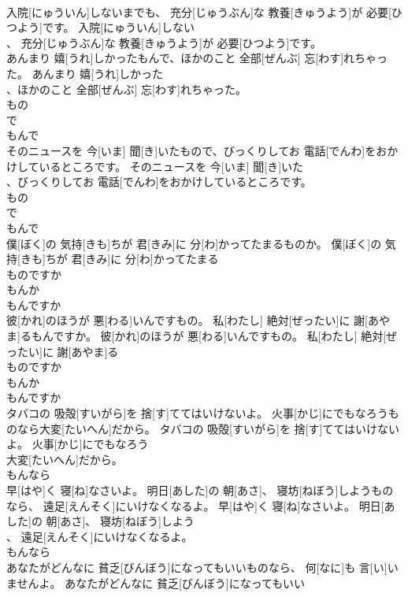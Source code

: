 \documentclass[8pt]{extreport}
\begin{document}
\begin{CJK}{UTF8}{min}
\\	入院[にゅういん]しないまでも、 充分[じゅうぶん]な 教養[きゅうよう]が 必要[ひつよう]です。	入院[にゅういん]しない
\\	、 充分[じゅうぶん]な 教養[きゅうよう]が 必要[ひつよう]です。	
\\	あんまり 嬉[うれ]しかったもんで、ほかのこと 全部[ぜんぶ] 忘[わす]れちゃった。	あんまり 嬉[うれ]しかった
\\	、ほかのこと 全部[ぜんぶ] 忘[わす]れちゃった。	
\\	もの 
\\	で 
\\	もんで 
\\	そのニュースを 今[いま] 聞[き]いたもので、びっくりしてお 電話[でんわ]をおかけしているところです。	そのニュースを 今[いま] 聞[き]いた
\\	、びっくりしてお 電話[でんわ]をおかけしているところです。	
\\	もの 
\\	で 
\\	もんで 
\\	僕[ぼく]の 気持[きも]ちが 君[きみ]に 分[わ]かってたまるものか。	僕[ぼく]の 気持[きも]ちが 君[きみ]に 分[わ]かってたまる
\\	ものですか 
\\	もんか 
\\	もんですか
\\	彼[かれ]のほうが 悪[わる]いんですもの。 私[わたし] 絶対[ぜったい]に 謝[あやま]るもんですか。	彼[かれ]のほうが 悪[わる]いんですもの。 私[わたし] 絶対[ぜったい]に 謝[あやま]る
\\	ものですか 
\\	もんか 
\\	もんですか
\\	タバコの 吸殻[すいがら]を 捨[す]ててはいけないよ。 火事[かじ]にでもなろうものなら大変[たいへん]だから。	タバコの 吸殻[すいがら]を 捨[す]ててはいけないよ。 火事[かじ]にでもなろう
\\	大変[たいへん]だから。	
\\	もんなら 
\\	早[はや]く 寝[ね]なさいよ。 明日[あした]の 朝[あさ]、 寝坊[ねぼう]しようものなら、 遠足[えんそく]にいけなくなるよ。	早[はや]く 寝[ね]なさいよ。 明日[あした]の 朝[あさ]、 寝坊[ねぼう]しよう
\\	、 遠足[えんそく]にいけなくなるよ。	
\\	もんなら 
\\	あなたがどんなに 貧乏[びんぼう]になってもいいものなら、 何[なに]も 言[い]いませんよ。	あなたがどんなに 貧乏[びんぼう]になってもいい

\end{CJK}
\end{document}
